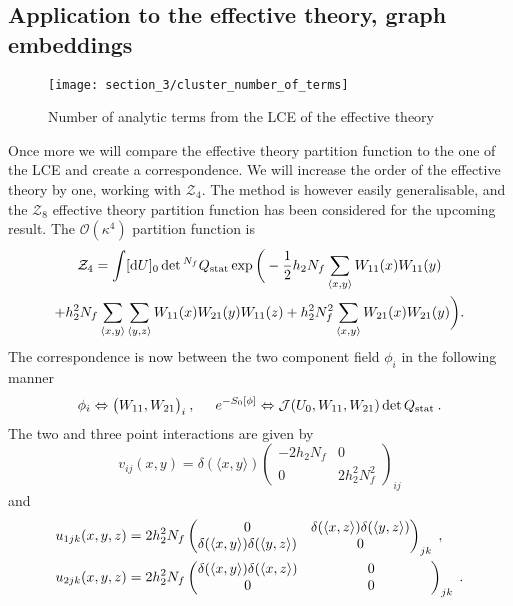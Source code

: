 \subsection{Application to the effective theory, graph embeddings}

\begin{figure}[t]
  {\centering
    \texttt{[image: section\_3/cluster\_number\_of\_terms]}\par}
  \caption{Number of analytic terms from the LCE of the effective theory}
  \label{fig:cluster_num_terms}
\end{figure}

Once more we will compare the effective theory partition function to the one of
the LCE and create a correspondence. We will increase the order of the effective
theory by one, working with $\mathcal{Z}_4$. The method is however easily
generalisable, and the $\mathcal{Z}_8$ effective theory partition function has
been considered for the upcoming result. The $\mathcal{O}(\kappa^4)$ partition
function is
%
\begin{multline}
  \mathcal{Z}_4 = \int [ \mathrm{d} U ]_0 \det{}^{N_f} Q_{\text{stat}} \exp \bigg(-\frac{1}{2}
    h_2 N_f \sum_{\langle x,y \rangle} W_{11} (x) W_{11} (y)\\
  + h_2^2 N_f \sum_{\langle x,y \rangle} \sum_{\langle y,z \rangle} W_{11}(x)
    W_{21}(y) W_{11}(z)
  + h_2^2 N_f^2 \sum_{\langle x,y \rangle} W_{21}(x) W_{21}(y) \bigg).
\end{multline}
%
The correspondence is now between the two component field $\phi_i$ in the
following manner
%
\begin{equation}
  \phi_i \Leftrightarrow \big(W_{11}, W_{21}\big)_i\:, \hskip .5cm
  e^{-S_0[\phi]} \Leftrightarrow \mathcal{J} (U_0, W_{11}, W_{21}) \det Q_{\text{stat}}
  \:.
\end{equation}
%
The two and three point interactions are given by
%
\begin{equation}
  v_{ij}(x,y) = \delta(\langle x,y \rangle)
    \begin{pmatrix}
      -2 h_2 N_f & 0 \\
      0 & 2 h_2^2 N_f^2
    \end{pmatrix}_{ij}
\end{equation}
%
and
%
\begin{align}
  u_{1jk}(x,y,z) &= 2 h_2^2 N_f 
    \begin{pmatrix}
      0 & \delta(\langle x,z \rangle) \delta(\langle y,z \rangle) \\
      \delta(\langle x,y \rangle) \delta(\langle y,z \rangle) & 0
    \end{pmatrix}_{jk} \;,\\
  u_{2jk}(x,y,z) &= 2 h_2^2 N_f  
  \begin{pmatrix}
    \delta(\langle x,y \rangle) \delta(\langle x,z \rangle) & 0 \\
    0 & \makebox[3cm][c]{$0$}
  \end{pmatrix}_{jk}\;.
\end{align}
